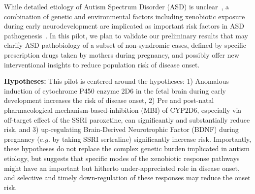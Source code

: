 \documentclass[onecolumn, compsoc,11pt]{IEEEtran}
\begin{document}
While detailed etiology of Autism Spectrum Disorder (ASD) is  unclear~\cite{hyman2020identification,nihasd,bolte2019contribution}, %
 a combination of genetic and environmental factors including xenobiotic exposure  during early %
neurodevelopment %
are implicated as important risk factors in ASD pathogenesis~\cite{bolte2019contribution,santos2022role}. In this pilot, we  plan to validate %
our preliminary results that may clarify ASD pathobiology of a  subset of non-syndromic cases, defined by specific prescription drugs taken by mothers during pregnancy,  and possibly offer new interventional insights to reduce population risk of disease onset. %

\textbf{Hypotheses:} This pilot is centered around  the  hypotheses: 1) Anomalous induction of cytochrome P450 enzyme 2D6 in the fetal brain during early development increases the risk of disease onset,  2) Pre and post-natal pharmacological  mechanism-based-inhibition (MBI) of CYP2D6, especially via off-target effect of the SSRI paroxetine,   can significantly and substantially reduce risk, and 3)  up-regulating Brain-Derived Neurotrophic Factor (BDNF) during pregnancy ($e.g.$ by taking SSRI sertraline) significantly increase risk. Importantly, these hypotheses do not replace the complex genetic burden  implicated in autism etiology, but suggests that specific modes of the xenobiotic response  pathways  might have an important but hitherto under-appreciated role in disease onset, and selective and timely down-regulation of these responses may reduce the onset risk. 
\end{document}
